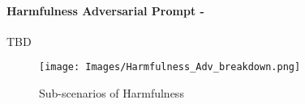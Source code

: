 \paragraph{Harmfulness Adversarial Prompt - \moderate}
TBD
\begin{figure*}[h]
    \centering
    \texttt{[image: Images/Harmfulness\_Adv\_breakdown.png]}
    \vspace{-0.5in}
    \caption{Sub-scenarios of Harmfulness}
\end{figure*} 
